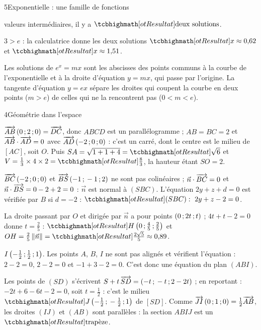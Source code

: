\begin{corrigeBac}{5}{Exponentielle : une famille de fonctions}
\begin{questions}[resume]
\begin{itemize}[leftmargin=1.2em,itemsep=0.3mm,topsep=0.5mm]
        valeurs intermédiaires, il y a $\res{\text{deux solutions}}$.
    \end{itemize}
  \item $3>e$ : la calculatrice donne les deux solutions $\res{x\approx0{,}62}$ et $\res{x\approx1{,}51}$. 
  \item Les solutions de $e^{x}=mx$ sont les abscisses des points communs à la courbe de l'exponentielle et à la droite d'équation
    $y=mx$, qui passe par l'origine. La tangente d'équation $y=ex$ sépare les droites qui coupent la courbe en deux points ($m>e$) de
    celles qui ne la rencontrent pas ($0<m<e$). 
\end{questions}
\end{corrigeBac}

\begin{corrigeBac}{4}{Géométrie dans l'espace}
\begin{questions}
  \item $\overrightarrow{AB}\,(0\,{;}\,2\,{;}\,0)=\overrightarrow{DC}$, donc $ABCD$ est un parallélogramme ; $AB=BC=2$ et $\overrightarrow{AB}\cdot\overrightarrow{AD}=0$ avec
    $\overrightarrow{AD}\,(-2\,{;}\,0\,{;}\,0)$ : c'est un carré, dont le centre est le milieu de $[AC]$, soit $O$. Puis $SA=\sqrt{1+1+4}=\res{\sqrt6}$ et
    $V=\frac13\times4\times2=\res{\tfrac83}$, la hauteur étant $SO=2$. \pts{1 pt}
  \item $\overrightarrow{BC}\,(-2\,{;}\,0\,{;}\,0)$ et $\overrightarrow{BS}\,(-1\,{;}\,-1\,{;}\,2)$ ne sont pas colinéaires ; $\vec n\cdot\overrightarrow{BC}=0$ et
    $\vec n\cdot\overrightarrow{BS}=0-2+2=0$ : $\vec n$ est normal à $(SBC)$. L'équation $2y+z+d=0$ est vérifiée par $B$ si $d=-2$ :
    $\res{(SBC):\ 2y+z-2=0}$. 
  \item La droite passant par $O$ et dirigée par $\vec n$ a pour points $(0\,{;}\,2t\,{;}\, t)$ ; $4t+t-2=0$ donne $t=\frac25$ :
    $\res{H\left(0\pv\tfrac45\pv\tfrac25\right)}$ et $OH=\frac25\norme{\vec n}=\res{\tfrac{2\sqrt5}{5}}\approx0{,}89$. 
  \item $I\left(-\frac12\,{;}\,\frac12\,{;}\,1\right)$. Les points $A$, $B$, $I$ ne sont pas alignés et vérifient l'équation : $2-2=0$, $2-2=0$ et
    $-1+3-2=0$. C'est donc une équation du plan $(ABI)$. 
  \item Les points de $(SD)$ s'écrivent $S+t\,\overrightarrow{SD}=(-t\,{;}\,-t\,{;}\,2-2t)$ ; en reportant : $-2t+6-6t-2=0$, soit $t=\frac12$ : c'est le
    milieu $\res{J\left(-\tfrac12\pv-\tfrac12\pv1\right)}$ de $[SD]$. Comme $\overrightarrow{JI}\,(0\,{;}\,1\,{;}\,0)=\frac12\overrightarrow{AB}$, les droites $(IJ)$ et
    $(AB)$ sont parallèles : la section $ABIJ$ est un $\res{\text{trapèze}}$. 
\end{questions}
\end{corrigeBac}

